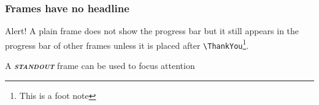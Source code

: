 \documentclass{beamer}
\begin{document}
\begin{frame}[plain]
      \frametitle{Frames have no headline}
      \begin{table}
            \small
      \end{table}
      \vfill
      \begin{alert}{Alert!}
            A plain frame does not show the progress bar but it still appears in the progress bar of other frames unless it is placed after \texttt{\textbackslash ThankYou}\footnote{This is a foot note}.
      \end{alert}
\end{frame}

\begin{frame}[standout]
      \Large
      A \textbf{\itshape\scshape standout} frame can be used to focus attention
\end{frame}
\end{document}
